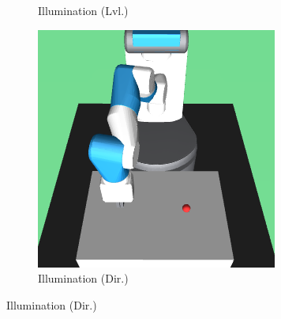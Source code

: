 \begin{figure}
\begin{subfigure}{0.19\textwidth}
    \caption{Illumination (Lvl.)}
  \end{subfigure}
  \begin{subfigure}{0.19\textwidth}
    \includegraphics[width=\textwidth]{figures/chapter6/test_observations/illumination_dir}
    \caption{Illumination (Dir.)}
  \end{subfigure}


\end{figure}
